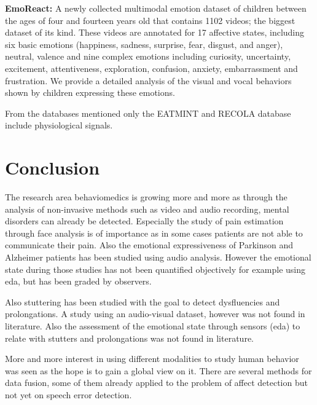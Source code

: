 \textbf{EmoReact:} A newly collected multimodal emotion dataset of children between the ages of four and fourteen years old that contains 1102 videos; the biggest dataset of its kind. These videos are annotated for 17 affective states, including six basic emotions (happiness, sadness, surprise, fear, disgust, and anger), neutral, valence and nine complex emotions including curiosity, uncertainty, excitement, attentiveness, exploration, confusion, anxiety, embarrassment and frustration. We provide a detailed analysis of the visual and vocal behaviors shown by children expressing these emotions.


From the databases mentioned only the EATMINT and RECOLA database include physiological signals.





\section{Conclusion}

The research area \gls{behaviomedics} is growing more and more as through the analysis of non-invasive methods such as video and audio recording, mental disorders can already be detected. Especially the study of pain estimation through face analysis is of importance as in some cases patients are not able to communicate their pain. Also the emotional expressiveness of Parkinson and Alzheimer patients has been studied using audio analysis. However the emotional state during those studies has not been quantified objectively for example using \gls{eda}, but has been graded by observers. 

Also stuttering has been studied with the goal to detect dysfluencies and prolongations. A study using an audio-visual dataset, however was not found in literature. Also the assessment of the emotional state through sensors (\gls{eda}) to relate with stutters and prolongations was not found in literature.

More and more interest in using different modalities to study human behavior was seen as the hope is to gain a global view on it. There are several methods for data fusion, some of them already applied to the problem of affect detection but not yet on speech error detection. 



\begin{comment}
( what is missing, how the techniques I want to use have been used for other applications but not the one I want to. how emotions can be evaluated quantitatively and that this was not done yet for stuttering. )

No video dataset studying stuttering.

\end{comment}


